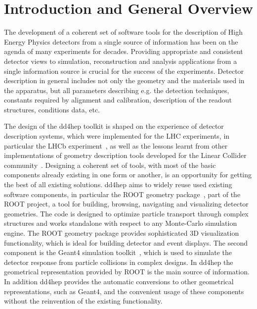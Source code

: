 \section{Introduction and General Overview}
\label{sec:introduction}
\noindent
The development of a coherent set of software tools for the description of 
High Energy Physics detectors from a single source of information has been
on the agenda of many experiments for decades.
Providing appropriate and consistent detector views to simulation, 
reconstruction and analysis applications from a single information source
is crucial for the success of the experiments.
Detector description in general includes not only the geometry and the 
materials used in the apparatus, but all parameters describing e.g. the 
detection techniques, constants required by alignment and calibration, 
description of the readout structures, conditions data, etc. 

\noindent
The design of the dd4hep toolkit\cite{bib:dd4hep} 
is shaped on the experience of detector description 
systems, which were implemented for the LHC experiments, in particular 
the LHCb experiment~\cite{bib:LHCb,bib:LHCb-geometry}, 
as well as the lessons learnt from other
implementations of geometry description tools developed for 
the Linear Collider community~\cite{bib:ILD,bib:SiD}. 
Designing a coherent set of tools, with most of the basic components 
already existing in one form or another, is an opportunity for getting 
the best of all existing solutions. 
dd4hep aims to widely reuse used existing software components, in particular
the ROOT geometry package~\cite{bib:ROOT-tgeo}, part of the 
ROOT project\cite{bib:ROOT}, a tool for 
building, browsing, navigating and visualizing detector geometries. The
code is designed to optimize particle transport through complex 
structures and works standalone with respect to any Monte-Carlo 
simulation engine. The ROOT geometry package provides
sophisticated 3D visualization functionality, which is ideal for building 
detector and event displays. The second component is 
the Geant4 simulation toolkit~\cite{bib:geant4}, which is used to 
simulate the detector response from particle collisions in complex designs.
In dd4hep the geometrical
representation provided by ROOT is the main source of information.
In addition dd4hep provides the automatic conversions to other geometrical 
representations, such as Geant4, and the convenient usage of these 
components without the reinvention of the existing functionality.

